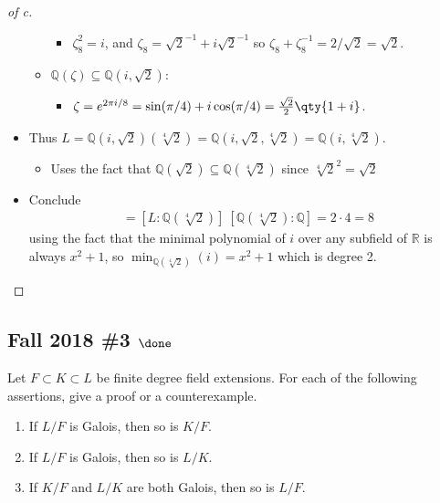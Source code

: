 \begin{solution}
\begin{proof}[of c]
\begin{itemize}
\begin{itemize}
    \begin{itemize}
    \tightlist
    \item
      \(\zeta_8^2 = i\), and \(\zeta_8 = \sqrt{2}^{-1}+ i\sqrt{2}^{-1}\)
      so \(\zeta_8 + \zeta_8 ^{-1}= 2/\sqrt{2} = \sqrt{2}\).
    \end{itemize}
  \item
    \({\mathbb{Q}}(\zeta) \subseteq {\mathbb{Q}}(i, \sqrt{2})\):

    \begin{itemize}
    \tightlist
    \item
      \(\zeta = e^{2\pi i / 8} = \sin(\pi/4) + i\cos(\pi/4) = {\sqrt 2 \over 2}\qty{1+i}\).
    \end{itemize}
  \end{itemize}
\item
  Thus
  \(L = {\mathbb{Q}}(i, \sqrt{2})(\sqrt[4]{2}) = {\mathbb{Q}}(i, \sqrt 2, \sqrt[4] 2) = {\mathbb{Q}}(i, \sqrt[4]{2})\).

  \begin{itemize}
  \tightlist
  \item
    Uses the fact that
    \({\mathbb{Q}}(\sqrt 2) \subseteq {\mathbb{Q}}(\sqrt[4] 2)\) since
    \(\sqrt[4]{2}^2 = \sqrt{2}\)
  \end{itemize}
\item
  Conclude
  \begin{align*}
  [L: {\mathbb{Q}}] = [L: {\mathbb{Q}}(\sqrt[4] 2)] ~[{\mathbb{Q}}(\sqrt[4] 2): {\mathbb{Q}}] = 2 \cdot 4 = 8
  \end{align*}
  using the fact that the minimal polynomial of \(i\) over any subfield
  of \({\mathbb{R}}\) is always \(x^2 + 1\), so
  \(\min_{{\mathbb{Q}}(\sqrt[4] 2)}(i) = x^2 + 1\) which is degree 2.
\end{itemize}

\end{proof}

\end{solution}

\hypertarget{fall-2018-3-done}{%
\subsection{\texorpdfstring{Fall 2018 \#3
\(\done\)}{Fall 2018 \#3 \textbackslash done}}\label{fall-2018-3-done}}

Let \(F \subset K \subset L\) be finite degree field extensions. For
each of the following assertions, give a proof or a counterexample.

\begin{enumerate}
\def\labelenumi{\alph{enumi}.}
\item
  If \(L/F\) is Galois, then so is \(K/F\).
\item
  If \(L/F\) is Galois, then so is \(L/K\).
\item
  If \(K/F\) and \(L/K\) are both Galois, then so is \(L/F\).
\end{enumerate}

